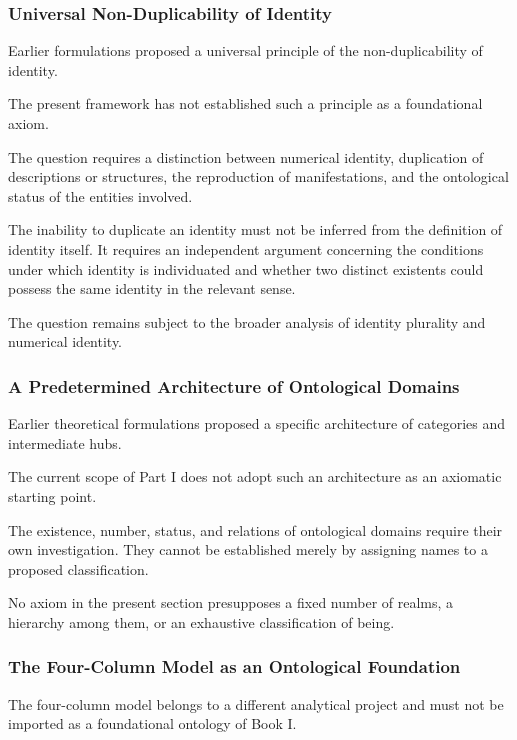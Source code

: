 \subsubsection{Universal Non-Duplicability of Identity}

Earlier formulations proposed a universal
principle of the non-duplicability of
identity.

The present framework has not established
such a principle as a foundational
axiom.

The question requires a distinction
between numerical identity, duplication
of descriptions or structures, the
reproduction of manifestations, and
the ontological status of the entities
involved.

The inability to duplicate an identity
must not be inferred from the definition
of identity itself. It requires an
independent argument concerning the
conditions under which identity is
individuated and whether two distinct
existents could possess the same
identity in the relevant sense.

The question remains subject to
the broader analysis of identity
plurality and numerical identity.

\subsubsection{A Predetermined Architecture of Ontological Domains}

Earlier theoretical formulations proposed
a specific architecture of categories
and intermediate hubs.

The current scope of Part I does not
adopt such an architecture as an
axiomatic starting point.

The existence, number, status, and
relations of ontological domains require
their own investigation. They cannot
be established merely by assigning
names to a proposed classification.

No axiom in the present section
presupposes a fixed number of realms,
a hierarchy among them, or an
exhaustive classification of being.

\subsubsection{The Four-Column Model as an Ontological Foundation}

The four-column model belongs to a
different analytical project and
must not be imported as a foundational
ontology of Book I.

